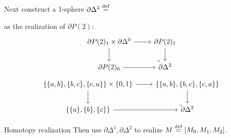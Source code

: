 \documentclass[14pt,aspectratio=169]{beamer}
\begin{document}
\begin{frame}
Next construct a 1-sphere \( \partial\Delta^2\stackrel{\mathrm{def}}{=} \)
 as the realization of \( \partial P(2) \):
\[%
\begin{tikzcd}[ampersand replacement=\&]
  {\partial P(2)_1\times \partial\Delta^0} \& {\partial P(2)_1} \\
  {\partial P(2)_0} \& {\partial\Delta^2}
  \arrow[from=1-1, to=1-2]
  \arrow[from=1-1, to=2-1]
  \arrow[from=1-2, to=2-2]
  \arrow[from=2-1, to=2-2]
  \arrow["\ulcorner"{pos=-0, rotate=180}, draw=none, from=2-2, to=1-1]
\end{tikzcd}\]
\[%
\begin{tikzcd}[ampersand replacement=\&]
  {\{\{a, b\}, \{b, c\}, \{c, a\}\}\times \{0, 1\}} \& {\{\{a, b\}, \{b, c\}, \{c, a\}\}} \\
  {\{\{a\}, \{b\}, \{c\}\}} \& {\partial\Delta^2}
  \arrow[from=1-1, to=1-2]
  \arrow[from=1-1, to=2-1]
  \arrow[from=1-2, to=2-2]
  \arrow[from=2-1, to=2-2]
  \arrow["\ulcorner"{pos=-0, rotate=180}, draw=none, from=2-2, to=1-1]
\end{tikzcd}\]
\end{frame}

\begin{frame}{Homotopy realization}
Then use \(  \partial\Delta^1, \partial\Delta^2 \) to realize \( M\stackrel{\mathrm{def}}{=}[M_0, M_1, M_2] \).
\[\]
\end{frame}
\end{document}

